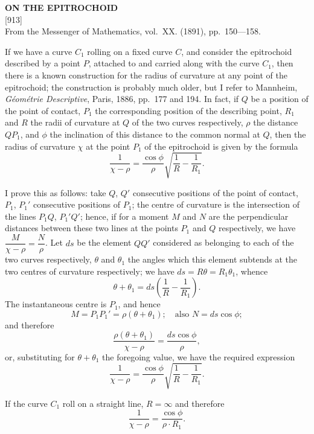 \documentclass[11pt,a4paper]{article}
\newcommand{\paper}[4]{%
  \newpage
  \begin{center}
    {\large\bfseries #2}\\[0.5em]
    {\small [#1]}\\[0.3em]
    {\small #3}
  \end{center}
  \vspace{0.5em}
}
\begin{document}
\setcounter{page}{101}

\paper{913}{ON THE EPITROCHOID}{From the Messenger of Mathematics, vol.~XX. (1891), pp.~150---158.}{}

If we have a curve $C_1$ rolling on a fixed curve $C$, and consider the epitrochoid described by a point $P$, attached to and carried along with the curve $C_1$, then there is a known construction for the radius of curvature at any point of the epitrochoid; the construction is probably much older, but I refer to Mannheim, \textit{G\'{e}om\'{e}trie Descriptive}, Paris, 1886, pp.~177 and 194. In fact, if $Q$ be a position of the point of contact, $P_1$ the corresponding position of the describing point, $R_1$ and $R$ the radii of curvature at $Q$ of the two curves respectively, $\rho$ the distance $QP_1$, and $\phi$ the inclination of this distance to the common normal at $Q$, then the radius of curvature $\chi$ at the point $P_1$ of the epitrochoid is given by the formula
\[
\frac{1}{\chi - \rho} = \frac{\cos\phi}{\rho}\sqrt{\frac{1}{R} - \frac{1}{R_1}}.
\]

I prove this as follows: take $Q$, $Q'$ consecutive positions of the point of contact, $P_1$, $P_1'$ consecutive positions of $P_1$; the centre of curvature is the intersection of the lines $P_1Q$, $P_1'Q'$; hence, if for a moment $M$ and $N$ are the perpendicular distances between these two lines at the points $P_1$ and $Q$ respectively, we have $\dfrac{M}{\chi - \rho} = \dfrac{N}{\rho}$. Let $ds$ be the element $QQ'$ considered as belonging to each of the two curves respectively, $\theta$ and $\theta_1$ the angles which this element subtends at the two centres of curvature respectively; we have $ds = R\theta = R_1\theta_1$, whence
\[
\theta + \theta_1 = ds\left(\frac{1}{R} - \frac{1}{R_1}\right).
\]
The instantaneous centre is $P_1$, and hence
\[
M = P_1P_1' = \rho(\theta + \theta_1); \quad \text{also } N = ds\cos\phi;
\]
and therefore
\[
\frac{\rho(\theta + \theta_1)}{\chi - \rho} = \frac{ds\cos\phi}{\rho},
\]
or, substituting for $\theta + \theta_1$ the foregoing value, we have the required expression
\[
\frac{1}{\chi - \rho} = \frac{\cos\phi}{\rho}\sqrt{\frac{1}{R} - \frac{1}{R_1}}.
\]

If the curve $C_1$ roll on a straight line, $R = \infty$ and therefore
\[
\frac{1}{\chi - \rho} = \frac{\cos\phi}{\rho \cdot R_1}.
\]
\end{document}
